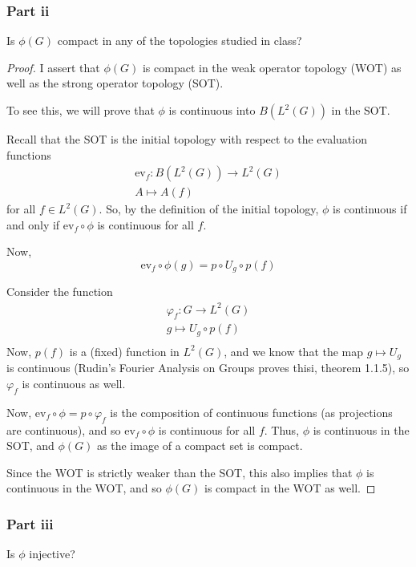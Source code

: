 \documentclass[fontsize=11pt]{scrartcl} %
\numberwithin{equation}{section} %
\numberwithin{figure}{section} %
\numberwithin{table}{section} %
\newcommand{\ev}{\textrm{ev}}
\begin{document}
\subsubsection*{Part ii}
Is $\phi(G)$ compact in any of the topologies studied in class?

\begin{proof}
    I assert that $\phi(G)$ is compact in the weak operator topology (WOT) as
    well as the strong operator topology (SOT). 

    To see this, we will prove that $\phi$ is continuous into $B(L^2(G))$ in the
    SOT.

    Recall that the SOT is the initial topology with respect to the evaluation
    functions
    \[
\begin{aligned}
    \ev_f:B(L^2(G))\to L^2(G)\\
    A\mapsto A(f)
\end{aligned}
    \]
    for all $f\in L^2(G)$. So, by the definition of the initial topology, $\phi$
    is continuous if and only if $\ev_f\circ\phi$ is continuous for all $f$.
    
    Now, 
    \[
        \ev_f\circ\phi(g) = p\circ U_g\circ p(f)
    \]

    Consider the function
    \[
        \begin{aligned}
            \varphi_f:G\to L^2(G)\\
            g\mapsto U_g\circ p(f)\\
        \end{aligned}
    \]
    Now, $p(f)$ is a (fixed) function in $L^2(G)$, and we know that the map
    $g\mapsto U_g$ is continuous (Rudin's Fourier Analysis on Groups proves
    thisi, theorem 1.1.5), so $\varphi_f$ is continuous as well.

    Now, $\ev_f\circ\phi = p\circ \varphi_f$ is the composition of continuous
    functions (as projections are continuous), and so $\ev_f\circ\phi$ is
    continuous for all $f$. Thus, $\phi$ is continuous in the SOT, and $\phi(G)$
    as the image of a compact set is compact.

    Since the WOT is strictly weaker than the SOT, this also implies that $\phi$
    is continuous in the WOT, and so $\phi(G)$ is compact in the WOT as well.
\end{proof}

\subsubsection*{Part iii}
Is $\phi$ injective?
\end{document}
